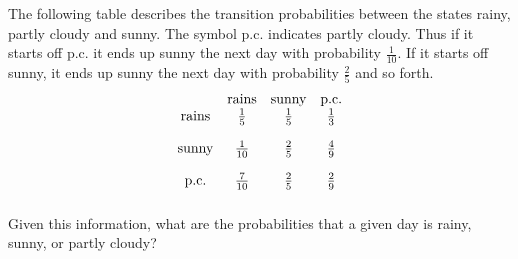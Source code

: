 \begin{enumialphparenastyle}
\begin{ex} The following table describes the transition probabilities between the
states rainy, partly cloudy and sunny. The symbol p.c. indicates partly
cloudy. Thus if it starts off p.c. it ends up sunny the next day with
probability $\frac{1}{10}.$ If it starts off sunny, it ends up sunny the
next day with probability $\frac{2}{5}$ and so forth.
\begin{equation*}
\begin{array}{cccc}
& \text{rains} & \text{sunny} & \text{p.c.} \\
\text{rains} & \vspace{0.05in}\frac{1}{5} & \vspace{0.05in}\frac{1}{5} & \vspace{0.05in}\frac{1}{3} \\
\text{sunny} & \vspace{0.05in}\frac{1}{10} & \vspace{0.05in}\frac{2}{5} & \vspace{0.05in}\frac{4}{9} \\
\text{p.c.} & \vspace{0.05in}\frac{7}{10} & \vspace{0.05in}\frac{2}{5} & \vspace{0.05in}\frac{2}{9}
\end{array}
\end{equation*}
Given this information, what are the probabilities that a given day is
rainy, sunny, or partly cloudy?
\end{ex}


\end{enumialphparenastyle}
